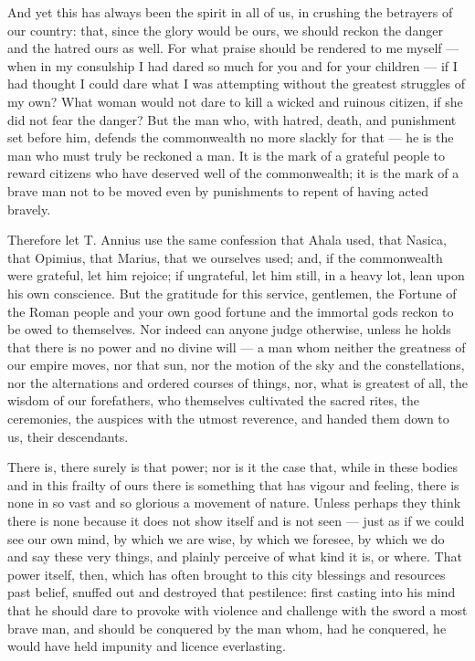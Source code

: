  And yet this has always been the spirit in all of us, in crushing the betrayers of our country: that, since the glory would be ours, we should reckon the danger and the hatred ours as well. For what praise should be rendered to me myself --- when in my consulship I had dared so much for you and for your children --- if I had thought I could dare what I was attempting without the greatest struggles of my own? What woman would not dare to kill a wicked and ruinous citizen, if she did not fear the danger? But the man who, with hatred, death, and punishment set before him, defends the commonwealth no more slackly for that --- he is the man who must truly be reckoned a man. It is the mark of a grateful people to reward citizens who have deserved well of the commonwealth; it is the mark of a brave man not to be moved even by punishments to repent of having acted bravely.

 Therefore let T. Annius use the same confession that Ahala used, that Nasica, that Opimius, that Marius, that we ourselves used; and, if the commonwealth were grateful, let him rejoice; if ungrateful, let him still, in a heavy lot, lean upon his own conscience. But the gratitude for this service, gentlemen, the Fortune of the Roman people and your own good fortune and the immortal gods reckon to be owed to themselves. Nor indeed can anyone judge otherwise, unless he holds that there is no power and no divine will --- a man whom neither the greatness of our empire moves, nor that sun, nor the motion of the sky and the constellations, nor the alternations and ordered courses of things, nor, what is greatest of all, the wisdom of our forefathers, who themselves cultivated the sacred rites, the ceremonies, the auspices with the utmost reverence, and handed them down to us, their descendants.

 There is, there surely is that power; nor is it the case that, while in these bodies and in this frailty of ours there is something that has vigour and feeling, there is none in so vast and so glorious a movement of nature. Unless perhaps they think there is none because it does not show itself and is not seen --- just as if we could see our own mind, by which we are wise, by which we foresee, by which we do and say these very things, and plainly perceive of what kind it is, or where. That power itself, then, which has often brought to this city blessings and resources past belief, snuffed out and destroyed that pestilence: first casting into his mind that he should dare to provoke with violence and challenge with the sword a most brave man, and should be conquered by the man whom, had he conquered, he would have held impunity and licence everlasting.


